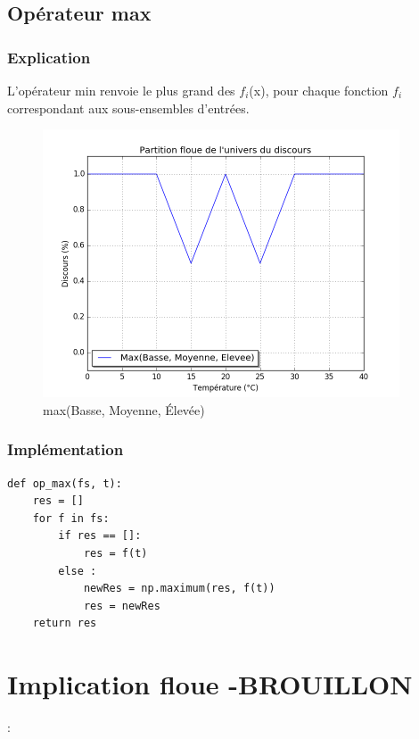 \documentclass[a4paper]{article}
\begin{document}
\subsection{Opérateur max}

\subsubsection{Explication}
L'opérateur min renvoie le plus grand des $f_i$(x), pour chaque fonction $f_i$ correspondant aux sous-ensembles d'entrées.

\begin{figure}[h]
\begin{center}
	\includegraphics[width=400px]{plot_test_max.png}
\end{center}
\caption{max(Basse, Moyenne, Élevée)}
\end{figure}

\subsubsection{Implémentation}
\begin{lstlisting}
def op_max(fs, t):
    res = []
    for f in fs:
        if res == []:
            res = f(t)
        else :
            newRes = np.maximum(res, f(t))
            res = newRes
    return res
\end{lstlisting}

\clearpage

\section{Implication floue -BROUILLON}:
\end{document}
